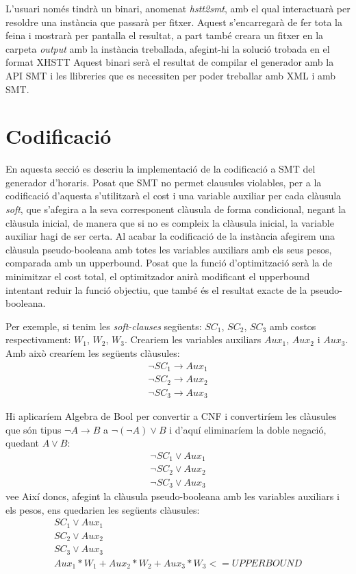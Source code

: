 \documentclass[11pt,a4paper,twoside]{report}
\begin{document}
  L'usuari només tindrà un binari, anomenat \textit{hstt2smt}, amb el qual interactuarà per resoldre una instància que passarà per fitxer. Aquest s'encarregarà de fer tota la feina i mostrarà per pantalla el resultat, a part també creara un fitxer en la carpeta \textit{output} amb la instància treballada, afegint-hi la solució trobada en el format XHSTT
  Aquest binari serà el resultat de compilar el generador amb la API SMT i les llibreries que es necessiten per poder treballar amb XML i amb SMT.

  \section{Codificació}
  En aquesta secció es descriu la implementació de la codificació a SMT del generador d'horaris. 
  Posat que SMT no permet clausules violables, per a la codificació d'aquesta s'utilitzarà el cost i una variable auxiliar per cada clàusula \textit{soft}, 
  que s'afegira a la seva corresponent clàusula de forma condicional, negant la clàusula inicial, de manera que si no es compleix la clàusula inicial, la variable auxiliar hagi de ser certa. Al acabar la codificació de la instància afegirem una clàusula pseudo-booleana amb totes les variables auxiliars amb els seus pesos, comparada amb un upperbound.
  Posat que la funció d'optimització serà la de minimitzar el cost total, el optimitzador anirà modificant el upperbound intentant reduir la funció objectiu, que també és el resultat exacte de la pseudo-booleana.

  Per exemple, si tenim les \textit{soft-clauses} següents: $SC_1$, $SC_2$, $SC_3$ amb costos respectivament: $W_1$, $W_2$, $W_3$. 
  Creariem les variables auxiliars $Aux_1$, $Aux_2$ i $Aux_3$. Amb això crearíem les següents clàusules:
  \begin{gather*}
    \neg SC_1 \rightarrow Aux_1 \\
    \neg SC_2 \rightarrow Aux_2 \\
    \neg SC_3 \rightarrow Aux_3
  \end{gather*}

  Hi aplicaríem Algebra de Bool per convertir a CNF i convertiríem les clàusules que són tipus $\neg A \rightarrow B$ a $\neg (\neg A) \vee B$ i d'aquí eliminaríem la doble negació, quedant $A \vee B$:
  \begin{gather*}
    \neg SC_1 \vee Aux_1 \\
    \neg SC_2 \vee Aux_2 \\
    \neg SC_3 \vee Aux_3
  \end{gather*}vee
  Així doncs, afegint la clàusula pseudo-booleana amb les variables auxiliars i els pesos, ens quedarien les següents clàusules:
  \begin{gather*}
      SC_1 \vee Aux_1 \\
      SC_2 \vee Aux_2 \\
      SC_3 \vee Aux_3 \\
      Aux_1*W_1 + Aux_2*W_2 + Aux_3*W_3 <= UPPERBOUND
  \end{gather*}
\end{document}
